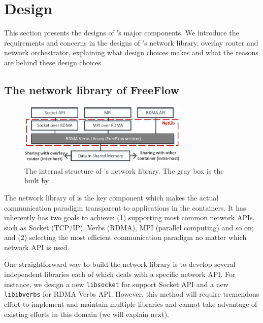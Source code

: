 \section{Design} \label{sec:design}

This section presents the designs of \sysname's major components. We introduce
the requirements and concerns in the designs of \sysname's network library, overlay router and network orchestrator, explaining what design choices 
\sysname makes and what the reasons are behind these design choices.

\subsection{The network library of FreeFlow}
\label{subsec:netlib}

\begin{figure}[t!] 
     \centering 
     \includegraphics[width=3.2in]{figures/netlib.pdf} 
    \caption{\label{fig:netlib} The internal structure of \sysname's network library. The gray box is the built by \sysname.} 
\end{figure} 

The network library of \sysname is the key component which makes
the actual communication paradigm transparent to applications in the containers.
It has inherently has two goals to achieve: (1) supporting most common network
APIs, such as Socket (TCP/IP), Verbs (RDMA), MPI (parallel computing) and so on;
and (2) selecting the most efficient communication paradigm no matter which network API is used. 

One straightforward way to build the network library is to develop several
independent libraries each of which deals with a specific network API. 
For instance, we design a new \texttt{libsocket} for support Socket API and 
a new \texttt{libibverbs} for RDMA Verbs API. However, this method will require
tremendous effort to implement and maintain multiple libraries and cannot take
advantage of existing efforts in this domain (we will explain next).


